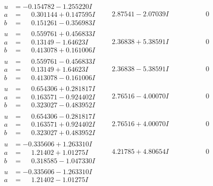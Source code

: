 \documentclass[1p]{elsarticle_modified}
\theoremstyle{definition}
\begin{document}
$$\begin{array}{c|c|c}
\begin{aligned}
u &= -0.154782 - 1.255220 I \\
a &= \phantom{-}0.301144 + 0.147595 I \\
b &= \phantom{-}0.151261 - 0.356983 I\end{aligned}
 & \phantom{-}2.87541 - 2.07039 I & \phantom{-0.000000 } 0 \\ \hline\begin{aligned}
u &= \phantom{-}0.559761 + 0.456833 I \\
a &= \phantom{-}0.13149 - 1.64623 I \\
b &= \phantom{-}0.413078 + 0.161006 I\end{aligned}
 & \phantom{-}2.36838 + 5.38591 I & \phantom{-0.000000 } 0 \\ \hline\begin{aligned}
u &= \phantom{-}0.559761 - 0.456833 I \\
a &= \phantom{-}0.13149 + 1.64623 I \\
b &= \phantom{-}0.413078 - 0.161006 I\end{aligned}
 & \phantom{-}2.36838 - 5.38591 I & \phantom{-0.000000 } 0 \\ \hline\begin{aligned}
u &= \phantom{-}0.654306 + 0.281817 I \\
a &= \phantom{-}0.163571 - 0.924402 I \\
b &= \phantom{-}0.323027 - 0.483952 I\end{aligned}
 & \phantom{-}2.76516 - 4.00070 I & \phantom{-0.000000 } 0 \\ \hline\begin{aligned}
u &= \phantom{-}0.654306 - 0.281817 I \\
a &= \phantom{-}0.163571 + 0.924402 I \\
b &= \phantom{-}0.323027 + 0.483952 I\end{aligned}
 & \phantom{-}2.76516 + 4.00070 I & \phantom{-0.000000 } 0 \\ \hline\begin{aligned}
u &= -0.335606 + 1.263310 I \\
a &= \phantom{-}1.21402 + 1.01275 I \\
b &= \phantom{-}0.318585 - 1.047330 I\end{aligned}
 & \phantom{-}4.21785 + 4.80654 I & \phantom{-0.000000 } 0 \\ \hline\begin{aligned}
u &= -0.335606 - 1.263310 I \\
a &= \phantom{-}1.21402 - 1.01275 I \\

\end{aligned}
\end{array}$$
\end{document}
